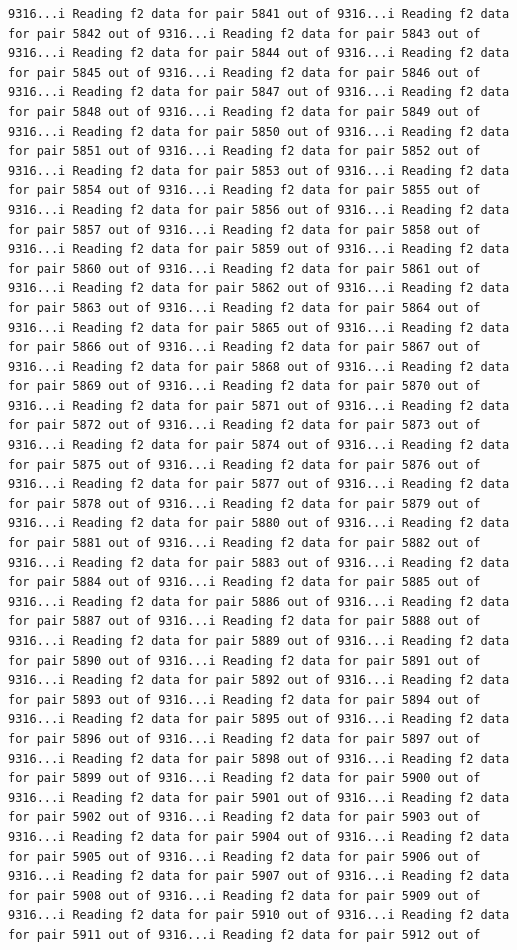 \documentclass[
]{article}
\begin{document}
\begin{verbatim}
9316...i Reading f2 data for pair 5841 out of 9316...i Reading f2 data for pair 5842 out of 9316...i Reading f2 data for pair 5843 out of 9316...i Reading f2 data for pair 5844 out of 9316...i Reading f2 data for pair 5845 out of 9316...i Reading f2 data for pair 5846 out of 9316...i Reading f2 data for pair 5847 out of 9316...i Reading f2 data for pair 5848 out of 9316...i Reading f2 data for pair 5849 out of 9316...i Reading f2 data for pair 5850 out of 9316...i Reading f2 data for pair 5851 out of 9316...i Reading f2 data for pair 5852 out of 9316...i Reading f2 data for pair 5853 out of 9316...i Reading f2 data for pair 5854 out of 9316...i Reading f2 data for pair 5855 out of 9316...i Reading f2 data for pair 5856 out of 9316...i Reading f2 data for pair 5857 out of 9316...i Reading f2 data for pair 5858 out of 9316...i Reading f2 data for pair 5859 out of 9316...i Reading f2 data for pair 5860 out of 9316...i Reading f2 data for pair 5861 out of 9316...i Reading f2 data for pair 5862 out of 9316...i Reading f2 data for pair 5863 out of 9316...i Reading f2 data for pair 5864 out of 9316...i Reading f2 data for pair 5865 out of 9316...i Reading f2 data for pair 5866 out of 9316...i Reading f2 data for pair 5867 out of 9316...i Reading f2 data for pair 5868 out of 9316...i Reading f2 data for pair 5869 out of 9316...i Reading f2 data for pair 5870 out of 9316...i Reading f2 data for pair 5871 out of 9316...i Reading f2 data for pair 5872 out of 9316...i Reading f2 data for pair 5873 out of 9316...i Reading f2 data for pair 5874 out of 9316...i Reading f2 data for pair 5875 out of 9316...i Reading f2 data for pair 5876 out of 9316...i Reading f2 data for pair 5877 out of 9316...i Reading f2 data for pair 5878 out of 9316...i Reading f2 data for pair 5879 out of 9316...i Reading f2 data for pair 5880 out of 9316...i Reading f2 data for pair 5881 out of 9316...i Reading f2 data for pair 5882 out of 9316...i Reading f2 data for pair 5883 out of 9316...i Reading f2 data for pair 5884 out of 9316...i Reading f2 data for pair 5885 out of 9316...i Reading f2 data for pair 5886 out of 9316...i Reading f2 data for pair 5887 out of 9316...i Reading f2 data for pair 5888 out of 9316...i Reading f2 data for pair 5889 out of 9316...i Reading f2 data for pair 5890 out of 9316...i Reading f2 data for pair 5891 out of 9316...i Reading f2 data for pair 5892 out of 9316...i Reading f2 data for pair 5893 out of 9316...i Reading f2 data for pair 5894 out of 9316...i Reading f2 data for pair 5895 out of 9316...i Reading f2 data for pair 5896 out of 9316...i Reading f2 data for pair 5897 out of 9316...i Reading f2 data for pair 5898 out of 9316...i Reading f2 data for pair 5899 out of 9316...i Reading f2 data for pair 5900 out of 9316...i Reading f2 data for pair 5901 out of 9316...i Reading f2 data for pair 5902 out of 9316...i Reading f2 data for pair 5903 out of 9316...i Reading f2 data for pair 5904 out of 9316...i Reading f2 data for pair 5905 out of 9316...i Reading f2 data for pair 5906 out of 9316...i Reading f2 data for pair 5907 out of 9316...i Reading f2 data for pair 5908 out of 9316...i Reading f2 data for pair 5909 out of 9316...i Reading f2 data for pair 5910 out of 9316...i Reading f2 data for pair 5911 out of 9316...i Reading f2 data for pair 5912 out of 
\end{verbatim}
\end{document}
